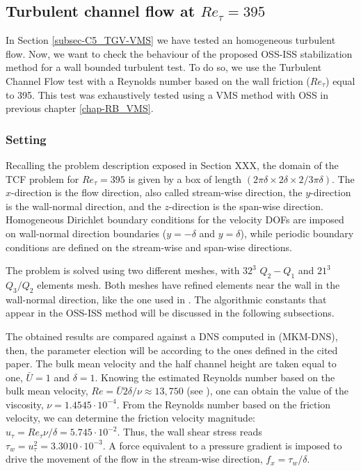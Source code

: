 \subsection{Turbulent channel flow at $Re_\tau=395$}
\label{subsec-C5_turb_channel}
In Section \ref{subsec-C5_TGV-VMS} we have tested an homogeneous turbulent flow. Now, we want to check the behaviour of the proposed OSS-ISS stabilization method for a wall bounded turbulent test. To do so, we use the Turbulent Channel Flow test with a Reynolds number based on the wall friction ($Re_\tau$) equal to 395. This test was exhaustively tested using a VMS method with OSS in previous chapter \ref{chap-RB_VMS}.

\subsubsection{Setting}
Recalling the problem description exposed in Section XXX, the domain of the TCF problem for $Re_\tau=395$ is given by a box of length $(2\pi\delta\times 2\delta\times 2/3\pi\delta)$. The $x$-direction is the flow direction, also called stream-wise direction, the $y$-direction is the wall-normal direction, and the $z$-direction is the span-wise direction. Homogeneous Dirichlet boundary conditions for the velocity DOFs are imposed on wall-normal direction boundaries ($y=-\delta$ and $y=\delta$), while periodic boundary conditions are defined on the stream-wise and span-wise directions.

The problem is solved using two different meshes, with $32^3$ $Q_2-Q_1$ and $21^3$ $Q_3/Q_2$ elements mesh. Both meshes have refined elements near the wall in the wall-normal direction, like the one used in \cite{colomes_assessment_2015}. The algorithmic constants that appear in the OSS-ISS method will be discussed in the following subsections.

The obtained results are compared against a DNS computed in \cite{moser_direct_1999,kim_turbulence_1987} (MKM-DNS), then, the parameter election will be according to the ones defined in the cited paper. The bulk mean velocity and the half channel height are taken equal to one, $\bar{U}=1$ and $\delta=1$. Knowing the estimated Reynolds number based on the bulk mean velocity, $Re=\bar{U}2\delta/\nu\approx 13,750$ (see \cite{pope_turbulent_2000}), one can obtain the value of the viscosity, $\nu=1.4545\cdot10^{-4}$. From the Reynolds number based on the friction velocity, we can determine the friction velocity magnitude: $u_\tau=Re_\tau\nu/\delta=5.745\cdot10^{-2}$. Thus, the wall shear stress reads $\tau_w=u_\tau^2=3.3010\cdot10^{-3}$. A force equivalent to a pressure gradient is imposed to drive the movement of the flow in the stream-wise direction, $f_x=\tau_w/\delta$.

